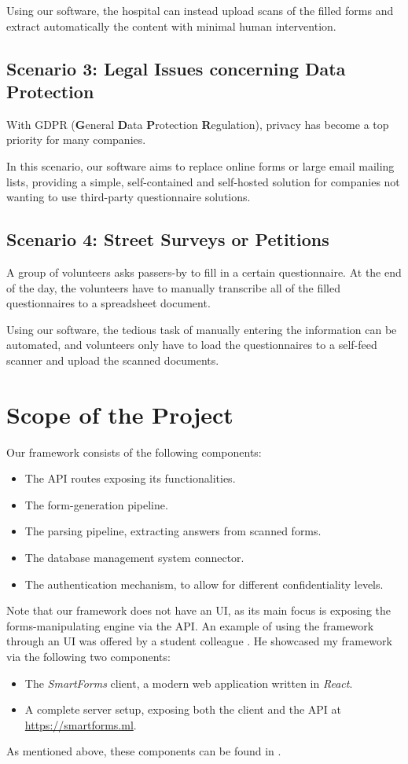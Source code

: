 \documentclass[11pt, a4paper]{report}
\begin{document}
Using our software, the hospital can instead upload scans of the filled forms and extract automatically the content with minimal human intervention.

\subsection*{Scenario 3:  Legal Issues concerning Data Protection}

With GDPR (\textbf{G}eneral \textbf{D}ata \textbf{P}rotection \textbf{R}egulation), privacy has become a top priority for many companies.

In this scenario, our software aims to replace online forms or large email mailing lists, providing a simple, self-contained and self-hosted solution for companies not wanting to use third-party questionnaire solutions.

\subsection*{Scenario 4: Street Surveys or Petitions}

A group of volunteers asks passers-by to fill in a certain questionnaire. At the end of the day, the volunteers have to manually transcribe all of the filled questionnaires to a spreadsheet document.

Using our software, the tedious task of manually entering the information can be automated, and volunteers only have to load the questionnaires to a self-feed scanner and upload the scanned documents.

\section{Scope of the Project}

Our framework consists of the following components:
\begin{itemize}
	\item The API routes exposing its functionalities.
	\item The form-generation pipeline.
	\item The parsing pipeline, extracting answers from scanned forms.
	\item The database management system connector.
	\item The authentication mechanism, to allow for different confidentiality levels.
\end{itemize}

Note that our framework does not have an UI, as its main focus is exposing the forms-manipulating engine via the API. An example of using the framework through an UI was offered by a student colleague \cite{felix}. He showcased my framework via the following two components:
\begin{itemize}
	\item The \textit{SmartForms} client, a modern web application written in \textit{React}.
	\item A complete server setup, exposing both the client and the API at \url{https://smartforms.ml}.
\end{itemize}
As mentioned above, these components can be found in \cite{felix}.
\end{document}
